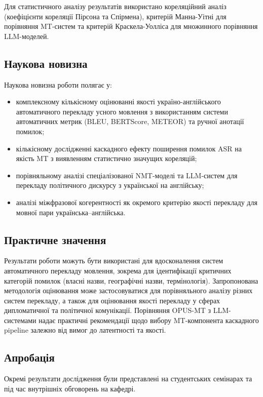 Для статистичного аналізу результатів використано кореляційний аналіз
(коефіцієнти кореляції Пірсона та Спірмена), критерій Манна-Уітні для
порівняння MT-систем та критерій Краскела-Уолліса для множинного
порівняння LLM-моделей.

\subsection{Наукова новизна}

Наукова новизна роботи полягає у:
\begin{itemize}[nosep]
    \item комплексному кількісному оцінюванні якості україно-англійського
    автоматичного перекладу усного мовлення з використанням системи
    автоматичних метрик (BLEU, BERTScore, METEOR) та ручної анотації помилок;
    \item кількісному дослідженні каскадного ефекту поширення помилок ASR
    на якість MT з виявленням статистично значущих кореляцій;
    \item порівняльному аналізі спеціалізованої NMT-моделі та LLM-систем
    для перекладу політичного дискурсу з української на англійську;
    \item аналізі міжфразової когерентності як окремого критерію якості
    перекладу для мовної пари українська--англійська.
\end{itemize}

\subsection{Практичне значення}

Результати роботи можуть бути використані для вдосконалення систем
автоматичного перекладу мовлення, зокрема для ідентифікації критичних
категорій помилок (власні назви, географічні назви, термінологія).
Запропонована методологія оцінювання може застосовуватися для порівняльного
аналізу різних систем перекладу, а також для оцінювання якості перекладу
у сферах дипломатичної та політичної комунікації. Порівняння OPUS-MT з LLM-системами надає практичні рекомендації щодо вибору
MT-компонента каскадного pipeline залежно від вимог до латентності та якості.

\subsection{Апробація}

Окремі результати дослідження були представлені на студентських семінарах та
під час внутрішніх обговорень на кафедрі.

\clearpage

